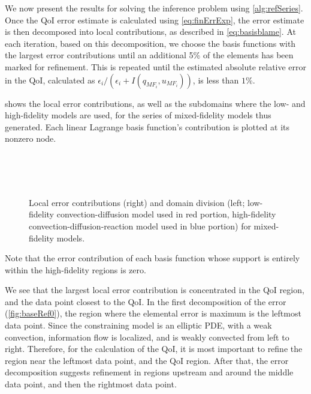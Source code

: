 We now present the results for solving the inference problem using \cref{alg:refSeries}. Once the QoI error estimate is calculated using \ref{eq:finErrExp}, the error estimate is then decomposed into local contributions, as described in \cref{eq:basisblame}. At each iteration, based on this decomposition, we choose the basis functions with the largest error contributions until an additional 5\% of the elements has been marked for refinement. This is repeated until the estimated absolute relative error in the QoI, calculated as $\epsilon_i/(\epsilon_i+I(q_{MF_i},u_{MF_i}))$, is less than $1\%$.

 shows the local error contributions, as well as the subdomains where the low- and high-fidelity models are used, for the series of mixed-fidelity models thus generated. Each linear Lagrange basis function's contribution is plotted at its nonzero node.
%
\begin{figure}[htbp]
\centering
{} \\
 \\
 \\
\caption{Local error contributions (right) and domain division (left; low-fidelity convection-diffusion model used in red portion, high-fidelity convection-diffusion-reaction model used in blue portion) for mixed-fidelity models.}
\label{fig:baseRef}
\end{figure}
%
Note that the error contribution of each basis function whose support is entirely within the high-fidelity regions is zero.

We see that the largest local error contribution is concentrated in the QoI region, and the data point closest to the QoI. In the first decomposition of the error (\cref{fig:baseRef0}), the region where the elemental error is maximum is the leftmost data point. Since the constraining model is an elliptic PDE, with a weak convection, information flow is localized, and is weakly convected from left to right. Therefore, for the calculation of the QoI, it is most important to refine the region near the leftmost data point, and the QoI region. After that, the error decomposition suggests refinement in regions upstream and around the middle data point, and then the rightmost data point.

